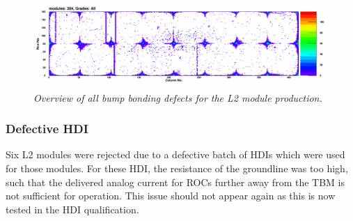 \documentclass[a4paper,12pt,twoside]{article}
\begin{document}
\begin{figure} [h!] \centering 
\includegraphics[width=\textwidth, angle=0] {./Figures/Xray_BB_All.png}
\caption{\em  \label{BB}
Overview of all bump bonding defects for the L2 module production.}
\end{figure}

\subsubsection{Defective HDI}
Six L2 modules were rejected due to a defective batch of HDIs which were used for those modules. For these HDI, the resistance of the groundline was too high, such that the delivered analog current for ROCs further away from the TBM is not sufficient for operation. This issue should not appear again as this is now tested in the HDI qualification.

\clearpage
\end{document}
